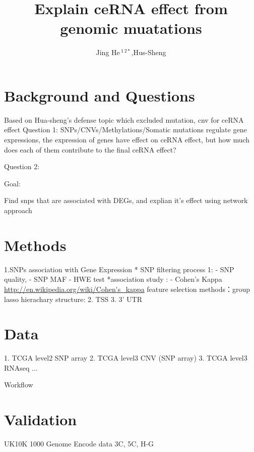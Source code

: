 \documentclass[a4paper,11pt]{article}
\title{Explain ceRNA effect from genomic muatations}
\author{Jing He\,$^{1\,2*}$,Hus-Sheng}
\affil[1]{Department of Biomedical Informatics, Columbia Medical Center}
\affil[2]{Center for Computational Biology and Bioinformatics}
\begin{document}

\maketitle

\section{Background and Questions}

Based on Hua-sheng's defense topic which excluded mutation, cnv for ceRNA effect
Question 1: SNPs/CNVs/Methylations/Somatic mutations regulate gene expressions, the expression of genes have effect on ceRNA effect, but how much does each of them contribute to the final ceRNA effect?

Question 2: 

Goal:

Find snps that are associated with DEGs, and explian it's effect using network approach


\section{Methods}

1.SNPs association with Gene Expression
	* SNP filtering process 1:
		- SNP quality, 
		- SNP MAF
		- HWE test
	*association study :
		- Cohen's Kappa  \url{http://en.wikipedia.org/wiki/Cohen's_kappa}
	feature selection methods：group lasso
	hierachary structure:
2. TSS 
3. 3' UTR

\section{Data}
1. TCGA level2 SNP array
2. TCGA level3 CNV (SNP array)
3. TCGA level3 RNAseq
$\dots$

Workflow
\subsection{} 


\subsection{}

\section{Validation}
UK10K
1000 Genome
Encode data 3C, 5C, H-G
\end{document}
